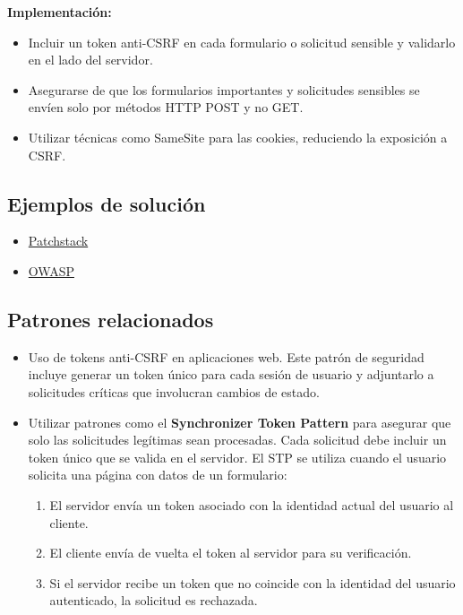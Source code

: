\textbf{Implementación:} \begin{itemize} \item Incluir un token anti-CSRF en cada formulario o solicitud sensible y validarlo en el lado del servidor. \item Asegurarse de que los formularios importantes y solicitudes sensibles se envíen solo por métodos HTTP POST y no GET. \item Utilizar técnicas como SameSite para las cookies, reduciendo la exposición a CSRF. \end{itemize}

\subsection{Ejemplos de solución}

\begin{itemize}
    \item \href{https://patchstack.com/academy/wordpress/securing-code/cross-site-request-forgery/}{Patchstack}
    \item \href{https://cheatsheetseries.owasp.org/cheatsheets/Cross-Site_Request_Forgery_Prevention_Cheat_Sheet.html}{OWASP}
\end{itemize}

\subsection{Patrones relacionados}

\begin{itemize}
    \item Uso de tokens anti-CSRF en aplicaciones web. Este patrón de seguridad incluye generar un token único para cada sesión de usuario y adjuntarlo a solicitudes críticas que involucran cambios de estado.
    \item Utilizar patrones como el \textbf{Synchronizer Token Pattern} para asegurar que solo las solicitudes legítimas sean procesadas. Cada solicitud debe incluir un token único que se valida en el servidor. El STP se utiliza cuando el usuario solicita una página con datos de un formulario:
    \begin{enumerate}
        \item El servidor envía un token asociado con la identidad actual del usuario al cliente.
        \item El cliente envía de vuelta el token al servidor para su verificación.
        \item Si el servidor recibe un token que no coincide con la identidad del usuario autenticado, la solicitud es rechazada.
    \end{enumerate}
\end{itemize}


